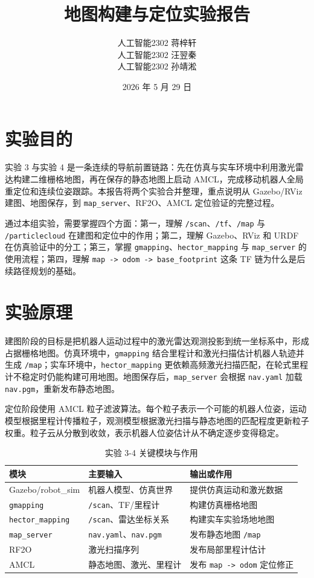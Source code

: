 \documentclass[11pt,a4paper,fontset=fandol]{ctexart}
\title{\bfseries 地图构建与定位实验报告}
\author{人工智能2302 \quad 蒋梓轩\\
人工智能2302 \quad 汪翌秦\\
人工智能2302 \quad 孙靖淞}
\date{2026 年 5 月 29 日}
\begin{document}
\maketitle

\section{实验目的}

实验 3 与实验 4 是一条连续的导航前置链路：先在仿真与实车环境中利用激光雷达构建二维栅格地图，再在保存的静态地图上启动 AMCL，完成移动机器人全局重定位和连续位姿跟踪。本报告将两个实验合并整理，重点说明从 Gazebo/RViz 建图、地图保存，到 \verb|map_server|、RF2O、AMCL 定位验证的完整过程。

通过本组实验，需要掌握四个方面：第一，理解 \verb|/scan|、\verb|/tf|、\verb|/map| 与 \verb|/particlecloud| 在建图和定位中的作用；第二，理解 Gazebo、RViz 和 URDF 在仿真验证中的分工；第三，掌握 \verb|gmapping|、\verb|hector_mapping| 与 \verb|map_server| 的使用流程；第四，理解 \verb|map -> odom -> base_footprint| 这条 TF 链为什么是后续路径规划的基础。

\section{实验原理}

建图阶段的目标是把机器人运动过程中的激光雷达观测投影到统一坐标系中，形成占据栅格地图。仿真环境中，\verb|gmapping| 结合里程计和激光扫描估计机器人轨迹并生成 \verb|/map|；实车环境中，\verb|hector_mapping| 更依赖高频激光扫描匹配，在轮式里程计不稳定时仍能构建可用地图。地图保存后，\verb|map_server| 会根据 \verb|nav.yaml| 加载 \verb|nav.pgm|，重新发布静态地图。

定位阶段使用 AMCL 粒子滤波算法。每个粒子表示一个可能的机器人位姿，运动模型根据里程计传播粒子，观测模型根据激光扫描与静态地图的匹配程度更新粒子权重。粒子云从分散到收敛，表示机器人位姿估计从不确定逐步变得稳定。

\begin{table}[H]
  \centering
  \caption{实验 3-4 关键模块与作用}
  \begin{tabular}{lll}
    \toprule
    模块 & 主要输入 & 输出或作用 \\
    \midrule
    Gazebo/robot\_sim & 机器人模型、仿真世界 & 提供仿真运动和激光数据 \\
    \verb|gmapping| & \verb|/scan|、TF/里程计 & 构建仿真栅格地图 \\
    \verb|hector_mapping| & \verb|/scan|、雷达坐标关系 & 构建实车实验场地地图 \\
    \verb|map_server| & \verb|nav.yaml|、\verb|nav.pgm| & 发布静态地图 \verb|/map| \\
    RF2O & 激光扫描序列 & 发布局部里程计估计 \\
    AMCL & 静态地图、激光、里程计 & 发布 \verb|map -> odom| 定位修正 \\
    \bottomrule
  \end{tabular}
\end{table}
\end{document}
